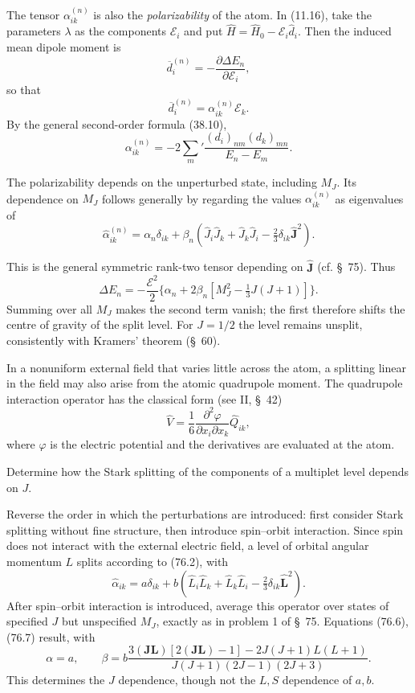 The tensor $\alpha_{ik}^{(n)}$ is also the \emph{polarizability} of the atom. In (11.16), take the parameters $\lambda$ as the components $\mathcal E_i$ and put $\widehat H=\widehat H_0-\mathcal E_i\widehat d_i$. Then the induced mean dipole moment is
\[\overline d_i^{(n)}=-\frac{\partial\Delta E_n}{\partial\mathcal E_i},\]
so that
\begin{equation}\overline d_i^{(n)}=\alpha_{ik}^{(n)}\mathcal E_k.\tag{76.4}\end{equation}
By the general second-order formula (38.10),
\begin{equation}\alpha_{ik}^{(n)}=-2\sum_m'\frac{(d_i)_{nm}(d_k)_{mn}}{E_n-E_m}.\tag{76.5}\end{equation}

The polarizability depends on the unperturbed state, including $M_J$. Its dependence on $M_J$ follows generally by regarding the values $\alpha_{ik}^{(n)}$ as eigenvalues of
\begin{equation}\widehat\alpha_{ik}^{(n)}=\alpha_n\delta_{ik}+\beta_n(\widehat J_i\widehat J_k+\widehat J_k\widehat J_i-\tfrac23\delta_{ik}\widehat{\mathbf J}^{2}).\tag{76.6}\end{equation}

This is the general symmetric rank-two tensor depending on $\widehat{\mathbf J}$ (cf. \S~75). Thus
\begin{equation}\Delta E_n=-\frac{\mathcal E^2}{2}\{\alpha_n+2\beta_n[M_J^2-\tfrac13J(J+1)]\}.\tag{76.7}\end{equation}
Summing over all $M_J$ makes the second term vanish; the first therefore shifts the centre of gravity of the split level. For $J=1/2$ the level remains unsplit, consistently with Kramers' theorem (\S~60).

In a nonuniform external field that varies little across the atom, a splitting linear in the field may also arise from the atomic quadrupole moment. The quadrupole interaction operator has the classical form (see II, \S~42)
\begin{equation}\widehat V=\frac16\frac{\partial^2\varphi}{\partial x_i\partial x_k}\widehat Q_{ik},\tag{76.8}\end{equation}
where $\varphi$ is the electric potential and the derivatives are evaluated at the atom.

 Determine how the Stark splitting of the components of a multiplet level depends on $J$.

\SolutionHeading Reverse the order in which the perturbations are introduced: first consider Stark splitting without fine structure, then introduce spin--orbit interaction. Since spin does not interact with the external electric field, a level of orbital angular momentum $L$ splits according to (76.2), with
\[\widehat\alpha_{ik}=a\delta_{ik}+b(\widehat L_i\widehat L_k+\widehat L_k\widehat L_i-\tfrac23\delta_{ik}\widehat{\mathbf L}^{2}).\]
After spin--orbit interaction is introduced, average this operator over states of specified $J$ but unspecified $M_J$, exactly as in problem 1 of \S~75. Equations (76.6), (76.7) result, with
\[\alpha=a,\qquad \beta=b\frac{3(\mathbf{JL})[2(\mathbf{JL})-1]-2J(J+1)L(L+1)}{J(J+1)(2J-1)(2J+3)}.\]
This determines the $J$ dependence, though not the $L,S$ dependence of $a,b$.

